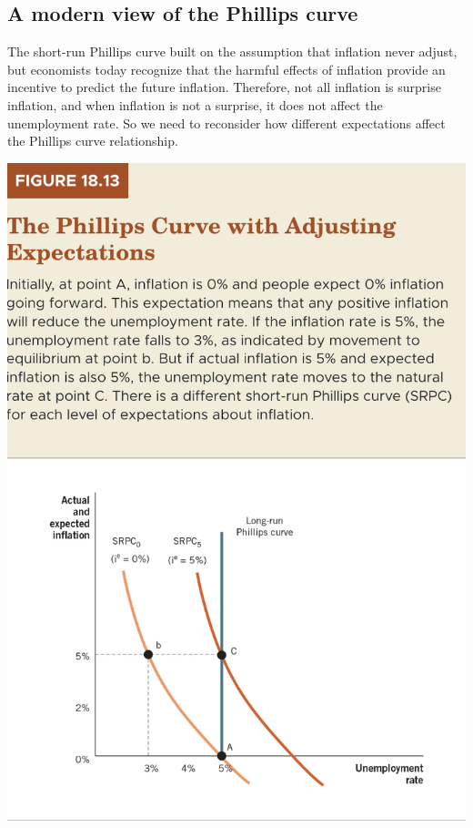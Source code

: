 \documentclass[11pt]{article} %
\begin{document}
\subsection*{A modern view of the Phillips curve}
The short-run Phillips curve built on the assumption that inflation never adjust, but economists today recognize that the harmful effects of inflation provide an incentive to predict the future inflation. Therefore, not all inflation is surprise inflation, and when inflation is not a surprise, it does not affect the unemployment rate. So we need to reconsider how different expectations affect the Phillips curve relationship.

\begin{center}
\includegraphics[scale=0.5]{images/Figure 18.13.png} 
\end{center}
\end{document}
